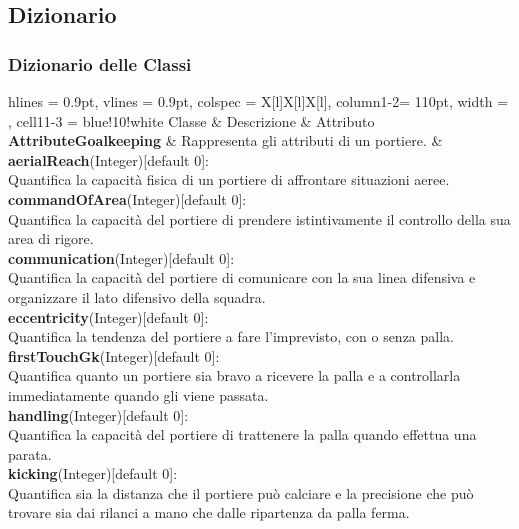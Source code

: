 \subsection{Dizionario}

\subsubsection{Dizionario delle Classi}



\begin{tblr}{
    hlines = {0.9pt}, vlines = {0.9pt}, colspec = {X[l]X[l]X[l]}, column{1-2}= {110pt},
    width = \textwidth, cell{1}{1-3} = {blue!10!white}
}
	{
		Classe
	}
	&
	{
		Descrizione
	}
	&
	{
		Attributo
	}
	\\
	{
		\textbf{AttributeGoalkeeping}
	}
	&
	{
		Rappresenta gli attributi di un portiere.
	}
	&
	{
		\textbf{aerialReach}(Integer)[default 0]:\\
			Quantifica la capacità fisica di un portiere
			di affrontare situazioni aeree.\\
		\medskip\textbf{commandOfArea}(Integer)[default 0]:\\
			Quantifica la capacità del portiere
			di prendere istintivamente il controllo
			della sua area di rigore.\\
		\medskip\textbf{communication}(Integer)[default 0]:\\
			 Quantifica la capacità del portiere di comunicare
			 con la sua linea difensiva e organizzare
			 il lato difensivo della squadra.\\
		\medskip\textbf{eccentricity}(Integer)[default 0]:\\
			Quantifica la tendenza del portiere
			a fare l'imprevisto, con o senza palla.\\
		\medskip\textbf{firstTouchGk}(Integer)[default 0]:\\
			Quantifica quanto un portiere sia bravo
			a ricevere la palla e a controllarla
			immediatamente quando gli viene passata.\\
		\medskip\textbf{handling}(Integer)[default 0]:\\
			Quantifica la capacità del portiere
			di trattenere la palla quando effettua una parata.\\
		\medskip\textbf{kicking}(Integer)[default 0]:\\
			Quantifica sia la distanza che
			il portiere può calciare e la precisione che
			può trovare sia dai rilanci a mano che
			dalle ripartenza da palla ferma.\\
}
\end{tblr}
